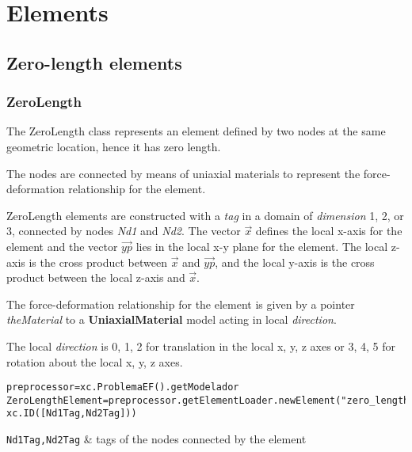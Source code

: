 \chapter{Elements}

\section{Zero-length elements}
\subsection{ZeroLength}
The ZeroLength class represents an element defined by two nodes at the same geometric location, hence it has zero length.

The nodes are connected by means of uniaxial materials to represent the force-deformation relationship for the element. 

ZeroLength elements are constructed with a {\em tag} in a domain of {\em dimension} 1, 2, or 3, connected by nodes {\em Nd1} and {\em Nd2}. 
The vector $\vec{x}$ defines the local x-axis for the element and the vector $\vec{yp}$ lies in the local x-y plane for the element.  The local z-axis is the cross product between $\vec{x}$ and $\vec{yp}$, and the local y-axis is the cross product between the local z-axis and $\vec{x}$.

The force-deformation relationship for the element is given by a pointer {\em theMaterial} to a {\bf UniaxialMaterial} model acting in local {\em direction}.

The local {\em direction} is 0, 1, 2 for translation in the local x, y, z axes or 3, 4, 5 for rotation about the local x, y, z axes. 

\begin{verbatim}
preprocessor=xc.ProblemaEF().getModelador
ZeroLengthElement=preprocessor.getElementLoader.newElement("zero_length",
xc.ID([Nd1Tag,Nd2Tag]))
\end{verbatim}
\begin{paramFuncTable}
{\tt Nd1Tag,Nd2Tag} & tags of the nodes connected by the element\\
\end{paramFuncTable}

\begin{paramClassTable}
\ElementParam{}
\ElementZERODParam{}
\end{paramClassTable}

\begin{methodsTable}
\ElementMeth{}
\ElementZERODMeth{}
\ZeroLengthMeth{}
\end{methodsTable}


